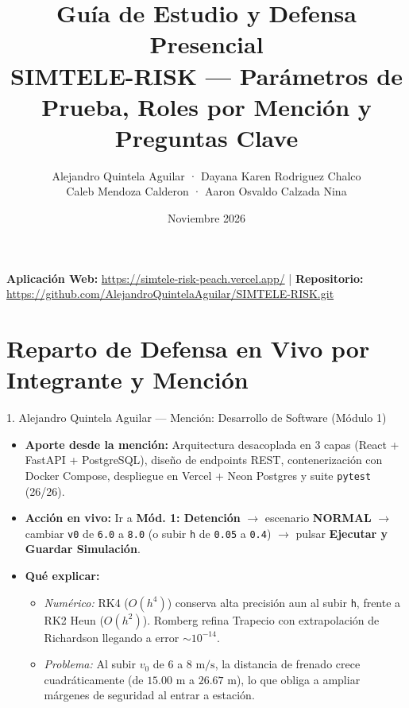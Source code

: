 \documentclass[11pt,a4paper]{article}
\title{\textbf{Guía de Estudio y Defensa Presencial} \\
\large SIMTELE-RISK — Parámetros de Prueba, Roles por Mención y Preguntas Clave}
\author{Alejandro Quintela Aguilar · Dayana Karen Rodriguez Chalco \\
Caleb Mendoza Calderon · Aaron Osvaldo Calzada Nina}
\date{Noviembre 2026}
\begin{document}
\maketitle

\noindent\textbf{Aplicación Web:} \url{https://simtele-risk-peach.vercel.app/} \quad | \quad
\textbf{Repositorio:} \url{https://github.com/AlejandroQuintelaAguilar/SIMTELE-RISK.git}

\tableofcontents
\newpage

\section{Reparto de Defensa en Vivo por Integrante y Mención}

\begin{ficha}{1. Alejandro Quintela Aguilar — Mención: Desarrollo de Software (Módulo 1)}
\begin{itemize}[noitemsep]
    \item \textbf{Aporte desde la mención:} Arquitectura desacoplada en 3 capas (React + FastAPI + PostgreSQL), diseño de endpoints REST, contenerización con Docker Compose, despliegue en Vercel + Neon Postgres y suite \texttt{pytest} (26/26).
    \item \textbf{Acción en vivo:} Ir a \textbf{Mód. 1: Detención} $\rightarrow$ escenario \textbf{NORMAL} $\rightarrow$ cambiar \texttt{v0} de \texttt{6.0} a \texttt{8.0} (o subir \texttt{h} de \texttt{0.05} a \texttt{0.4}) $\rightarrow$ pulsar \textbf{Ejecutar y Guardar Simulación}.
    \item \textbf{Qué explicar:}
    \begin{itemize}[noitemsep]
        \item \textit{Numérico:} RK4 ($O(h^4)$) conserva alta precisión aun al subir \texttt{h}, frente a RK2 Heun ($O(h^2)$). Romberg refina Trapecio con extrapolación de Richardson llegando a error $\sim 10^{-14}$.
        \item \textit{Problema:} Al subir $v_0$ de $6$ a $8\text{ m/s}$, la distancia de frenado crece cuadráticamente (de $15.00\text{ m}$ a $26.67\text{ m}$), lo que obliga a ampliar márgenes de seguridad al entrar a estación.
    \end{itemize}
\end{itemize}
\end{ficha}
\end{document}
